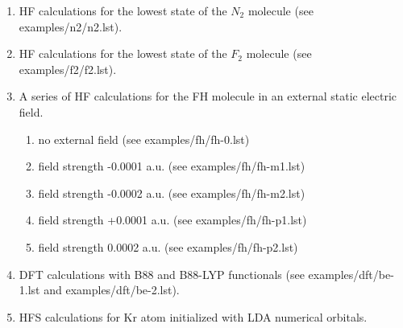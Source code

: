 \documentclass[12pt,a4paper]{article}
\begin{document}
\begin{enumerate}


\item HF calculations for the lowest state of the $N_2$ molecule (see
  examples/n2/n2.lst).




\newpage
\item HF calculations for the lowest state of the $F_2$ molecule (see
  examples/f2/f2.lst).



\newpage
\item A series of HF calculations for the FH molecule in an external
  static electric field.

\begin{enumerate}
\item no external field (see examples/fh/fh-0.lst)




\newpage

\item field strength -0.0001 a.u. (see examples/fh/fh-m1.lst)



\item field strength -0.0002 a.u. (see examples/fh/fh-m2.lst)



\newpage

\item field strength +0.0001 a.u. (see examples/fh/fh-p1.lst)



\item field strength 0.0002 a.u. (see examples/fh/fh-p2.lst)


\end{enumerate}

\newpage

\item DFT calculations with B88 and B88-LYP functionals (see
  examples/\-dft/\-be-1.\-lst and examples/\-dft/\-be-2.\-lst).





\newpage

\item HFS calculations for Kr atom initialized with LDA numerical orbitals.


\end{enumerate}
\end{document}
